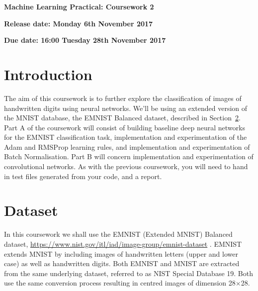 \documentclass[11pt,]{article}
\author{}
\date{}
\begin{document}
\begin{center}
\textsf{\textbf{\Large Machine Learning Practical: Coursework 2}}

\bigskip
\textbf{Release date: Monday 6th November 2017}

\textbf{Due date: 16:00 Tuesday 28th November 2017}
\end{center}

\section{Introduction}
\label{sec:introduction}

The aim of this coursework is to further explore the classification of images of handwritten digits using neural networks.  We'll be using an extended version of the MNIST database, the EMNIST Balanced dataset, described in Section~\ref{sec:emnist}. Part A of the coursework will consist of building baseline deep neural networks for the EMNIST classification task, implementation  and experimentation of the Adam and RMSProp learning rules, and  implementation  and experimentation of Batch Normalisation.  Part B will concern implementation and experimentation of convolutional networks.  As with the previous coursework, you will need to hand in test files generated from your code, and a report.

\section{Dataset}
\label{sec:emnist}
In this coursework we shall use the  EMNIST  (Extended MNIST) Balanced dataset, \url{https://www.nist.gov/itl/iad/image-group/emnist-dataset} \citep{cohen2017emnist}.  EMNIST extends MNIST by including images of handwritten letters (upper and lower case) as well as handwritten digits.  Both EMNIST and MNIST are extracted from the same underlying dataset, referred to as NIST Special Database 19.  Both use the same conversion process resulting in centred images of dimension 28$\times$28.  
\end{document}
